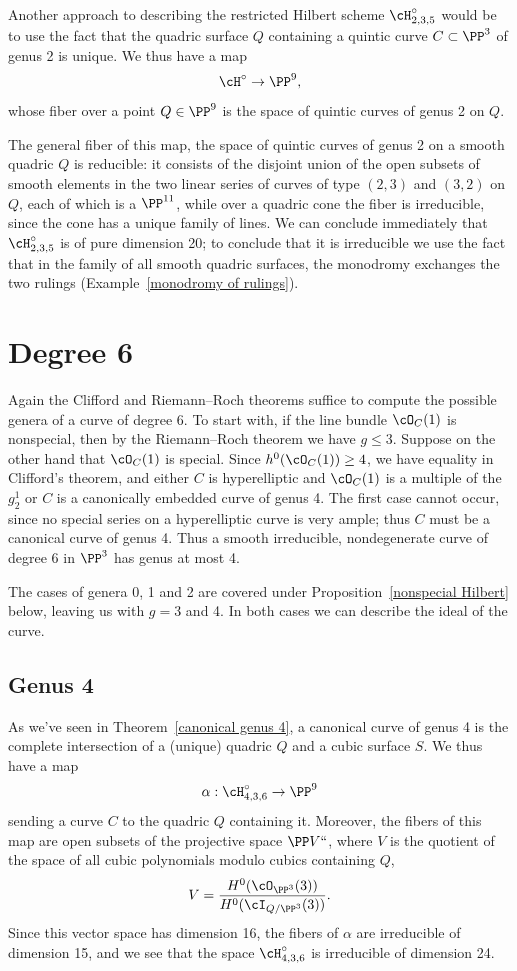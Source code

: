 Another approach to describing the restricted Hilbert scheme
$\cH^\circ_{2,3,5}$ would be to use the fact that the quadric surface $Q$
containing a quintic curve $C \subset \PP^3$ of genus 2 is unique. We
thus have a map
$$
\cH^\circ \to \PP^9,
$$
whose fiber over a point $Q \in \PP^9$ is the space of quintic curves
of genus 2 on $Q$.

The general fiber of this map, the space of quintic curves of genus 2 on a
smooth quadric $Q$ is  reducible: it consists of the disjoint union of the
open subsets of smooth elements in the two linear series of curves of type
$(2,3)$ and $(3,2)$ on $Q$, each of which is a $\PP^{11}$, while over a
quadric cone the fiber is irreducible, since the cone has a unique
family of lines.  We can conclude immediately that $\cH^\circ_{2,3,5}$
is of pure dimension 20; to conclude that it is irreducible we use the
fact that in the family of all smooth quadric surfaces, the
monodromy
%
exchanges the two rulings (Example~\ref{monodromy of rulings}).

\section{Degree 6}

Again the Clifford and Riemann--Roch theorems suffice to compute the
possible genera of a curve of degree 6. To start with,  if the line bundle
$\cO_C(1)$ is nonspecial, then by the Riemann--Roch theorem we have $g
\leq 3$. Suppose on the other hand that $\cO_C(1)$ is special. Since
$h^{0}(\cO_C(1)) \geq 4$, we have equality in Clifford's theorem,
and either $C$ is hyperelliptic and $\cO_C(1)$ is a multiple of the
$g^{1}_{2}$ or  $C$ is  a canonically embedded curve of genus 4. The
first case cannot occur, since no special series on a hyperelliptic
curve is very ample; thus $C$ must be a canonical curve of genus 4. Thus
a smooth irreducible, nondegenerate curve of degree 6 in $\PP^3$ has
genus at most 4.

The cases of genera 0, 1 and 2 are covered under
Proposition~\ref{nonspecial Hilbert} below, leaving us 
with
$g =
3$ and 4. In both cases we can describe the ideal of the curve.

\subsection*{Genus 4}

As we've seen in
Theorem~\ref{canonical genus 4},
a canonical curve of genus 4 is the complete intersection of a (unique)
quadric $Q$ and a cubic surface $S$. We thus have a map
$$
\alpha : \cH^\circ_{4,3,6} \to \PP^9
$$
sending a curve $C$ to the quadric $Q$ containing it. Moreover, the
%
fibers of this map are open subsets of the projective space $\PP V` `$,
where $V$ is the quotient of the space of all cubic polynomials modulo
cubics containing $Q$,
$$
V = \frac{H^0(\cO_{\PP^3}(3))}{H^0(\cI_{Q/\PP^3}(3))}.
$$
Since this vector space has dimension 16, the fibers of $\alpha$
are irreducible of dimension 15, and we 
see
that the space
$\cH^\circ_{4,3,6}$ is irreducible of dimension 24.


